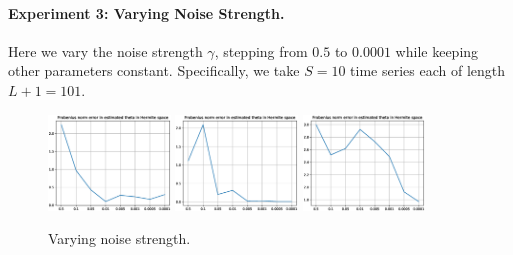 \documentclass{article}
\begin{document}
\paragraph{Experiment 3: Varying Noise Strength.} Here we vary the noise strength $\gamma$, stepping from $0.5$ to $0.0001$ while keeping other parameters constant.  Specifically, we take $S=10$ time series each of length $L+1 = 101$.
\begin{figure}[th]
\includegraphics[height=1in]{../1dcode/varying_noise/plots/hermite.eps}
\includegraphics[height=1in]{../2dcode/varying_noise/plots/hermite.eps}
\includegraphics[height=1in]{../3ddampedduffing/varying_noise/plots/hermite.eps}
\caption{Varying noise strength.}
\label{fig:exp2}
\end{figure}
\end{document}
